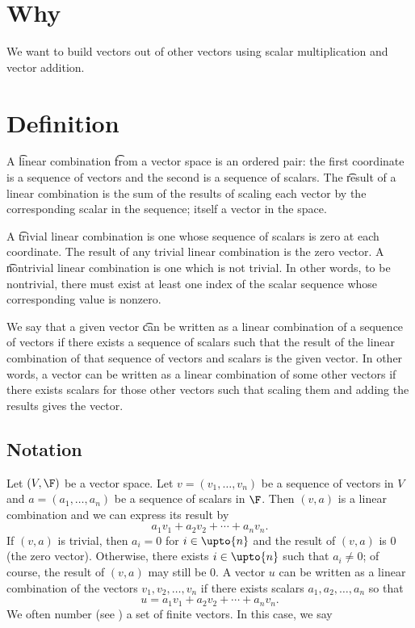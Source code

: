 
\section*{Why}

We want to build vectors out of other vectors using scalar multiplication and vector addition.

\section*{Definition}

A \t{linear combination} \t{from} a vector space is an ordered pair: the first coordinate is a sequence of vectors and the second is a sequence of scalars.
The \t{result} of a linear combination is the sum of the results of scaling each vector by the corresponding scalar in the sequence; itself a vector in the space.

A \t{trivial linear combination} is one whose sequence of scalars is zero at each coordinate.
The result of any trivial linear combination is the zero vector.
A \t{nontrivial linear combination} is one which is not trivial.
In other words, to be nontrivial, there must exist at least one index of the scalar sequence whose corresponding value is nonzero.

We say that a given vector \t{can be written as a linear combination of} a sequence of vectors if there exists a sequence of scalars such that the result of the linear combination of that sequence of vectors and scalars is the given vector.
In other words, a vector can be written as a linear combination of some other vectors if there exists scalars for those other vectors such that scaling them and adding the results gives the vector.

\subsection*{Notation}

Let $(V, \F )$ be a vector space.
Let $v = (v_1, \dots , v_n)$ be a sequence of vectors in $V$ and
$a = (a_1, \dots , a_n)$ be a sequence of scalars in $\F $.
Then $(v, a)$ is a linear combination and we can express its result by
  \[
a_1v_1 + a_2v_2 + \cdots + a_n v_n.
  \]
If $(v,a)$ is trivial, then $a_i = 0$ for $i \in \upto{n}$ and the result of $(v, a)$ is $0$ (the zero vector).
Otherwise, there exists $i \in \upto{n}$ such that $a_i \neq 0$; of course, the result of $(v, a)$ may still be $0$.
A vector $u$ can be written as a linear combination of the vectors $v_1, v_2, \dots , v_n$ if there exists scalars $a_1, a_2, \dots , a_n$ so that
  \[
u = a_1v_1 + a_2v_2 + \cdots + a_nv_n.
  \]
We often number (see ) a set of finite vectors.
In this case, we say 
